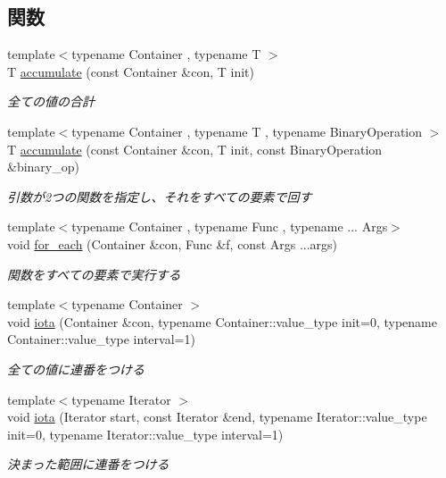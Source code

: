 \subsection*{関数}
\begin{DoxyCompactItemize}
\item 
{\footnotesize template$<$typename Container , typename T $>$ }\\T \mbox{\hyperlink{namespacesaki_a0f9963378e1e25eb379f002fc2675544}{accumulate}} (const Container \&con, T init)
\begin{DoxyCompactList}\small\item\em 全ての値の合計 \end{DoxyCompactList}\item 
{\footnotesize template$<$typename Container , typename T , typename Binary\+Operation $>$ }\\T \mbox{\hyperlink{namespacesaki_a8ecf606c3b0a7c7448938838e528de7b}{accumulate}} (const Container \&con, T init, const Binary\+Operation \&binary\+\_\+op)
\begin{DoxyCompactList}\small\item\em 引数が2つの関数を指定し、それをすべての要素で回す \end{DoxyCompactList}\item 
{\footnotesize template$<$typename Container , typename Func , typename ... Args$>$ }\\void \mbox{\hyperlink{namespacesaki_a68b1b59736df091f8a987d35e5773d2a}{for\+\_\+each}} (Container \&con, Func \&f, const Args ...args)
\begin{DoxyCompactList}\small\item\em 関数をすべての要素で実行する \end{DoxyCompactList}\item 
{\footnotesize template$<$typename Container $>$ }\\void \mbox{\hyperlink{namespacesaki_a09fe69a84525eaaec6ad1d377c23c027}{iota}} (Container \&con, typename Container\+::value\+\_\+type init=0, typename Container\+::value\+\_\+type interval=1)
\begin{DoxyCompactList}\small\item\em 全ての値に連番をつける \end{DoxyCompactList}\item 
{\footnotesize template$<$typename Iterator $>$ }\\void \mbox{\hyperlink{namespacesaki_a60fc6028a57a55dcc37d01458997f7e3}{iota}} (Iterator start, const Iterator \&end, typename Iterator\+::value\+\_\+type init=0, typename Iterator\+::value\+\_\+type interval=1)
\begin{DoxyCompactList}\small\item\em 決まった範囲に連番をつける \end{DoxyCompactList}\end{DoxyCompactItemize}


